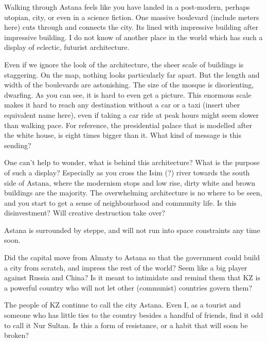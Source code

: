 \documentclass{article}
\begin{document}
Walking through Astana feels like you have landed in a post-modern, perhaps utopian, city, or even in a science fiction. One massive boulevard (include meters here) cuts through and connects the city. Its lined with impressive building after impressive building. I do not know of another place in the world which has such a display of eclectic, futurist architecture.

Even if we ignore the look of the architecture, the sheer scale of buildings is staggering. On the map, nothing looks particularly far apart. But the length and width of the boulevards are astonishing. The size of the mosque is disorienting, dwarfing. As you can see, it is hard to even get a picture. 
This enormous scale makes it hard to reach any destination without a car or a taxi (insert uber equivalent name here), even if taking a car ride at peak hours might seem slower than walking pace. 
For reference, the presidential palace that is modelled after the white house, is eight times bigger than it. What kind of message is this sending? 

One can't help to wonder, what is behind this architecture? What is the purpose of such a display? Especially as you cross the Isim (?) river towards the south side of Astana, where the modernism stops and low rise, dirty white and brown buildings are the majority. The overwhelming architecture is no where to be seen, and you start to get a sense of neighbourhood and community life. Is this disinvestment? Will creative destruction take over?

Astana is surrounded by steppe, and will not run into space constraints any time soon. 

Did the capital move from Almaty to Astana so that the government could build a city from scratch, and impress the rest of the world? Seem like a big player against Russia and China? Is it meant to intimidate and remind them that KZ is a powerful country who will not let other (communist) countries govern them? 


The people of KZ continue to call the city Astana. Even I, as a tourist and someone who has little ties to the country besides a handful of friends, find it odd to call it Nur Sultan. Is this a form of resistance, or a habit that will soon be broken?


\pagebreak

\printbibliography
\end{document}
